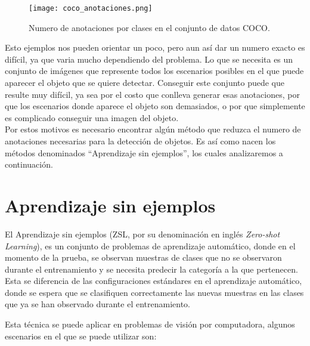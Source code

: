 \begin{figure}
	\centering
	\texttt{[image: coco\_anotaciones.png]}
	\caption{Numero de anotaciones por clases en el conjunto de datos COCO.}
	\label{fig:COCOAnotaciones}
\end{figure}

Esto ejemplos nos pueden orientar un poco, pero aun así dar un numero exacto es difícil, ya que varia mucho dependiendo del problema. Lo que se necesita es un conjunto de imágenes que represente todos los escenarios posibles en el que puede aparecer el objeto que se quiere detectar. Conseguir este conjunto puede que resulte muy difícil, ya sea por el costo que conlleva generar esas anotaciones, por que los escenarios donde aparece el objeto son demasiados, o por que simplemente es complicado conseguir una imagen del objeto.\\

Por estos motivos es necesario encontrar algún método que reduzca el numero de anotaciones necesarias para la detección de objetos. Es así como nacen los métodos denominados ``Aprendizaje sin ejemplos'', los cuales analizaremos a continuación.
 
\section{Aprendizaje sin ejemplos} \label{sec:aprendizajesinejemplos}
El Aprendizaje sin ejemplos (ZSL, por su denominación en inglés \textit{Zero-shot Learning}), es un conjunto de problemas de aprendizaje automático, donde en el momento de la prueba, se observan muestras de clases que no se observaron durante el entrenamiento y se necesita predecir la categoría a la que pertenecen. Esta se diferencia de las configuraciones estándares en el aprendizaje automático, donde se espera que se clasifiquen correctamente las nuevas muestras en las clases que ya se han observado durante el entrenamiento. 

Esta técnica se puede aplicar en problemas de visión por computadora, algunos escenarios en el que se puede utilizar son:

